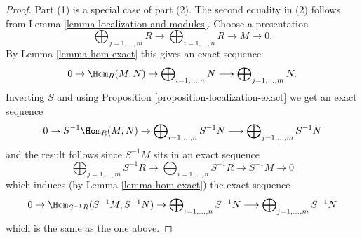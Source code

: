 \begin{proof}
Part (1) is a special case of part (2).
The second equality in (2) follows from
Lemma \ref{lemma-localization-and-modules}.
Choose a presentation
$$
\bigoplus\nolimits_{j = 1, \ldots, m} R
\longrightarrow
\bigoplus\nolimits_{i = 1, \ldots, n} R
\to M \to 0.
$$
By
Lemma \ref{lemma-hom-exact}
this gives an exact sequence
$$
0 \to
\Hom_R(M, N) \to
\bigoplus\nolimits_{i = 1, \ldots, n} N
\longrightarrow
\bigoplus\nolimits_{j = 1, \ldots, m} N.
$$
Inverting $S$ and using Proposition \ref{proposition-localization-exact}
we get an exact sequence
$$
0 \to
S^{-1}\Hom_R(M, N) \to
\bigoplus\nolimits_{i = 1, \ldots, n} S^{-1}N
\longrightarrow
\bigoplus\nolimits_{j = 1, \ldots, m} S^{-1}N
$$
and the result follows since $S^{-1}M$ sits in
an exact sequence
$$
\bigoplus\nolimits_{j = 1, \ldots, m} S^{-1}R
\longrightarrow
\bigoplus\nolimits_{i = 1, \ldots, n} S^{-1}R \to S^{-1}M \to 0
$$
which induces (by Lemma \ref{lemma-hom-exact})
the exact sequence
$$
0 \to
\Hom_{S^{-1}R}(S^{-1}M, S^{-1}N) \to
\bigoplus\nolimits_{i = 1, \ldots, n} S^{-1}N
\longrightarrow
\bigoplus\nolimits_{j = 1, \ldots, m} S^{-1}N
$$
which is the same as the one above.
\end{proof}





